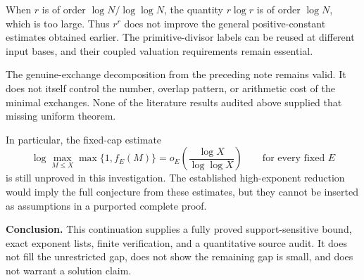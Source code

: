 \documentclass[11pt]{article}
\begin{document}
When $r$ is of order $\log N/\log\log N$, the quantity $r\log r$ is of order $\log N$, which is too large. Thus $r^r$ does not improve the general positive-constant estimates obtained earlier. The primitive-divisor labels can be reused at different input bases, and their coupled valuation requirements remain essential.

The genuine-exchange decomposition from the preceding note remains valid. It does not itself control the number, overlap pattern, or arithmetic cost of the minimal exchanges. None of the literature results audited above supplied that missing uniform theorem.

In particular, the fixed-cap estimate
\[
 \log\max_{M\le X}\max\{1,f_E(M)\}
 =o_E\!\left(\frac{\log X}{\log\log X}\right)
 \qquad\text{for every fixed }E
\]
is still unproved in this investigation. The established high-exponent reduction would imply the full conjecture from these estimates, but they cannot be inserted as assumptions in a purported complete proof.

\textbf{Conclusion.} This continuation supplies a fully proved support-sensitive bound, exact exponent lists, finite verification, and a quantitative source audit. It does not fill the unrestricted gap, does not show the remaining gap is small, and does not warrant a solution claim.
\end{document}
